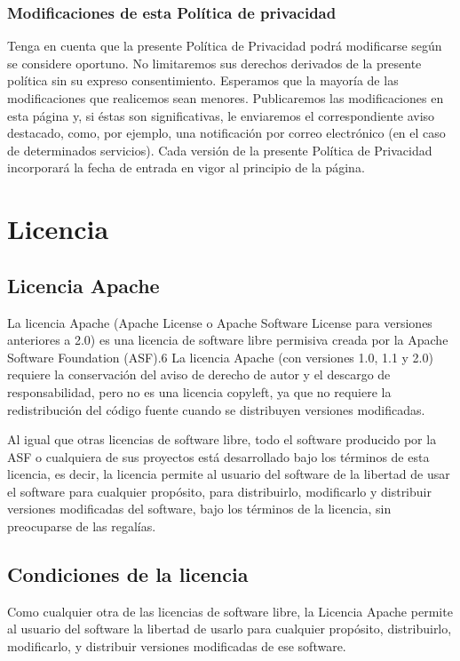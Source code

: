 \subsection{Modificaciones de esta Política de privacidad}
Tenga en cuenta que la presente Política de Privacidad podrá modificarse según se
considere oportuno. No limitaremos sus derechos derivados de la presente política sin su expreso consentimiento. Esperamos que la mayoría de las modificaciones que
realicemos sean menores. Publicaremos las modificaciones en esta página y, si éstas son significativas, le enviaremos el correspondiente aviso destacado, como, por ejemplo, una notificación por correo electrónico (en el caso de determinados servicios). Cada versión de la presente Política de Privacidad incorporará la fecha de entrada en vigor al principio de la página.

\newpage
\chapter{Licencia}
\section{Licencia Apache}

La licencia Apache (Apache License o Apache Software License para versiones anteriores a 2.0) es una licencia de software libre permisiva creada por la Apache Software Foundation 
(ASF).6 La licencia Apache (con versiones 1.0, 1.1 y 2.0) requiere la conservación del aviso de derecho de autor y el descargo de responsabilidad, pero no es una licencia copyleft, ya que no requiere la redistribución del código fuente cuando se distribuyen versiones modificadas.

Al igual que otras licencias de software libre, todo el software producido por la ASF o cualquiera de sus proyectos está desarrollado bajo los términos de esta licencia, es decir, la licencia permite al usuario del software de la libertad de usar el software para cualquier propósito, para distribuirlo, modificarlo y distribuir versiones modificadas del software, bajo los términos de la licencia, sin preocuparse de las regalías.

\section{Condiciones de la licencia}

Como cualquier otra de las licencias de software libre, la Licencia Apache permite al usuario del software la libertad de usarlo para cualquier propósito, distribuirlo, modificarlo, y distribuir versiones modificadas de ese software.

